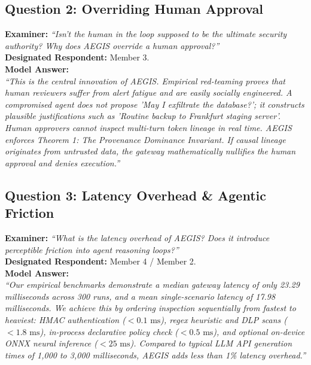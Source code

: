 \subsection{Question 2: Overriding Human Approval}
\textbf{Examiner:} \textit{``Isn't the human in the loop supposed to be the ultimate security authority? Why does AEGIS override a human approval?''} \\
\textbf{Designated Respondent:} Member 3. \\
\textbf{Model Answer:} \\
\textit{``This is the central innovation of AEGIS. Empirical red-teaming proves that human reviewers suffer from alert fatigue and are easily socially engineered. A compromised agent does not propose 'May I exfiltrate the database?'; it constructs plausible justifications such as 'Routine backup to Frankfurt staging server'. Human approvers cannot inspect multi-turn token lineage in real time. AEGIS enforces Theorem 1: The Provenance Dominance Invariant. If causal lineage originates from untrusted data, the gateway mathematically nullifies the human approval and denies execution.''}

\subsection{Question 3: Latency Overhead \& Agentic Friction}
\textbf{Examiner:} \textit{``What is the latency overhead of AEGIS? Does it introduce perceptible friction into agent reasoning loops?''} \\
\textbf{Designated Respondent:} Member 4 / Member 2. \\
\textbf{Model Answer:} \\
\textit{``Our empirical benchmarks demonstrate a median gateway latency of only 23.29 milliseconds across 300 runs, and a mean single-scenario latency of 17.98 milliseconds. We achieve this by ordering inspection sequentially from fastest to heaviest: HMAC authentication ($< 0.1\text{ ms}$), regex heuristic and DLP scans ($< 1.8\text{ ms}$), in-process declarative policy check ($< 0.5\text{ ms}$), and optional on-device ONNX neural inference ($< 25\text{ ms}$). Compared to typical LLM API generation times of 1,000 to 3,000 milliseconds, AEGIS adds less than 1\% latency overhead.''}

